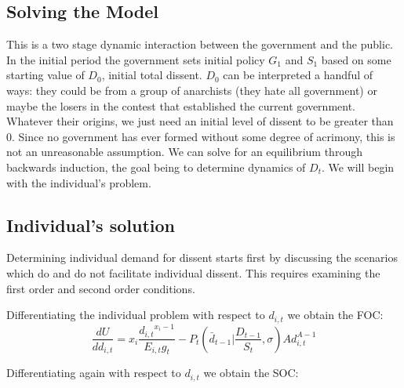 \documentclass[12pt]{article}
\begin{document}
\begin{spacing}{1.5}


 
 
 
 
 
\section{Solving the Model}

This is a two stage dynamic interaction between the government and the public. In the initial period the government sets initial policy $G_1$ and $S_1$ based on some starting value of $D_0$, initial total dissent. $D_0$ can be interpreted a handful of ways: they could be from a group of anarchists (they hate all government) or maybe the losers in the contest that established the current government. Whatever their origins, we just need an initial level of dissent to be greater than 0. Since no government has ever formed without some degree of acrimony, this is not an unreasonable assumption. We can solve for an equilibrium through backwards induction, the goal being to determine dynamics of $D_t$. We will begin with the individual's problem. 

 
\subsection{Individual's solution}

Determining individual demand for dissent starts first by discussing the scenarios which do and do not facilitate individual dissent. This requires examining the first order and second order conditions. 
 
\vspace{.5 em}
\noindent Differentiating the individual problem with respect to $d_{i,t}$ we obtain the FOC: 
\begin{equation}
\frac{dU}{dd_{i,t}} = x_i \frac{{d_{i,t}}^{x_i -1}}{E_{i,t} g_t} - P_t \left(\bar{d}_{t-1} \Big|\frac{D_{t-1}}{S_t},\sigma \right)Ad_{i,t}^{A-1}  
\end{equation}

\noindent Differentiating again with respect to $d_{i,t}$ we obtain the SOC: 


\end{spacing}
\end{document}
